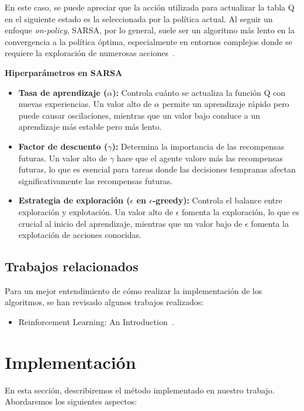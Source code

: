 \documentclass[conference,a4paper]{IEEEtran}
\begin{document}
En este caso, se puede apreciar que la acción utilizada para actualizar la tabla Q en el siguiente estado es la seleccionada por la política actual. Al seguir un enfoque \textit{on-policy}, SARSA, por lo general, suele ser un algoritmo más lento en la convergencia a la política óptima, especialmente en entornos complejos donde se requiere la 
exploración de numerosas acciones~\cite{b4}.\newline

\textbf{Hiperparámetros en SARSA}
\begin{itemize}
  \item \textbf{Tasa de aprendizaje (\(\alpha\)):} Controla cuánto se actualiza la función Q con nuevas experiencias. Un valor alto de \(\alpha\) permite un aprendizaje rápido pero puede causar oscilaciones, mientras que un valor bajo conduce a un aprendizaje más estable pero más lento.
  \item \textbf{Factor de descuento (\(\gamma\)):} Determina la importancia de las recompensas futuras. Un valor alto de \(\gamma\) hace que el agente valore más las recompensas futuras, lo que es esencial para tareas donde las decisiones tempranas afectan significativamente las recompensas futuras.
  \item \textbf{Estrategia de exploración (\(\epsilon\) en \(\epsilon\)-greedy):} Controla el balance entre exploración y explotación. Un valor alto de \(\epsilon\) fomenta la exploración, lo que es crucial al inicio del aprendizaje, mientras que un valor bajo de \(\epsilon\) fomenta la explotación de acciones conocidas.\newline
\end{itemize}

\subsection{Trabajos relacionados}
Para un mejor entendimiento de cómo realizar la implementación de los algoritmos, se han revisado algunos trabajos realizados:
\begin{itemize}
  \item Reinforcement Learning: An Introduction~\cite{b1}.
\end{itemize}

\section{Implementación}

En esta sección, describiremos el método implementado en nuestro trabajo. Abordaremos los siguientes aspectos:
\end{document}
